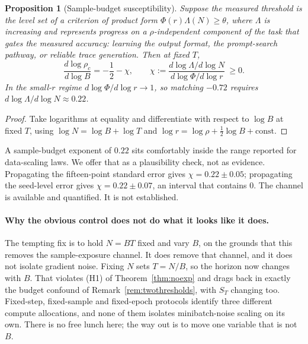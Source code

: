 \documentclass{article}
\theoremstyle{plain}
\newtheorem{proposition}{Proposition}
\theoremstyle{definition}
\theoremstyle{remark}
\newcommand{\1}{\mathbf{1}}
\begin{document}
\begin{proposition}[Sample-budget susceptibility]
\label{prop:susceptibility}
Suppose the measured threshold is the level set of a criterion of product form
$\Phi(r)\Lambda(N)\ge\theta$, where $\Lambda$ is increasing and represents
progress on a $\rho$-independent component of the task that gates the measured
accuracy: learning the output format, the prompt-search pathway, or reliable
trace generation. Then at fixed $T$,
\begin{equation}
\label{eq:susceptibility}
\frac{d\log\rho_c}{d\log B} = -\frac12 - \chi,
\qquad
\chi := \frac{d\log\Lambda/d\log N}{d\log\Phi/d\log r}\ \ge 0 .
\end{equation}
In the small-$r$ regime $d\log\Phi/d\log r\to1$, so matching $-0.72$ requires
$d\log\Lambda/d\log N\approx0.22$.
\end{proposition}

\begin{proof}
Take logarithms at equality and differentiate with respect to $\log B$ at fixed
$T$, using $\log N = \log B+\log T$ and
$\log r = \log\rho+\tfrac12\log B+\mathrm{const}$.
\end{proof}

A sample-budget exponent of $0.22$ sits comfortably inside the range reported for
data-scaling laws. We offer that as a plausibility check, not as evidence.
Propagating the fifteen-point standard error gives $\chi = 0.22\pm0.05$;
propagating the seed-level error gives $\chi = 0.22\pm0.07$, an interval that
contains $0$. The channel is available and quantified. It is not established.

\paragraph{Why the obvious control does not do what it looks like it does.}
The tempting fix is to hold $N = BT$ fixed and vary $B$, on the grounds that this
removes the sample-exposure channel. It does remove that channel, and it does not
isolate gradient noise. Fixing $N$ sets $T = N/B$, so the horizon now changes
with $B$. That violates (H1) of Theorem~\ref{thm:noexp} and drags back in exactly
the budget confound of Remark~\ref{rem:twothresholds}, with $S_T$ changing too.
Fixed-step, fixed-sample and fixed-epoch protocols identify three different
compute allocations, and none of them isolates minibatch-noise scaling on its
own. There is no free lunch here; the way out is to move one variable that is not
$B$.
\end{document}

